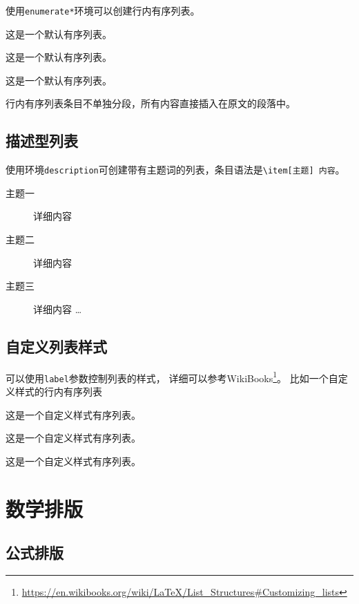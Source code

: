 \documentclass[doctor,openright,twoside]{sjtuthesis}
\theoremstyle{plain}
\theoremstyle{definition}
\theoremstyle{remark}
\theoremstyle{ocrenumbox}
\theoremstyle{plain}
\begin{document}
使用\verb+enumerate*+环境可以创建行内有序列表。

\begin{enumerate*}
  \item 这是一个默认有序列表。
  \item 这是一个默认有序列表。
  \item 这是一个默认有序列表。
\end{enumerate*}

行内有序列表条目不单独分段，所有内容直接插入在原文的段落中。

\subsection{描述型列表}

使用环境\verb+description+可创建带有主题词的列表，条目语法是\verb+\item[主题] 内容+。

\begin{description}
    \item[主题一] 详细内容
    \item[主题二] 详细内容
    \item[主题三] 详细内容 \ldots
\end{description}

\subsection{自定义列表样式}

可以使用\verb+label+参数控制列表的样式，
详细可以参考WikiBooks\footnote{\url{https://en.wikibooks.org/wiki/LaTeX/List_Structures\#Customizing_lists}}。
比如一个自定义样式的行内有序列表

\begin{enumerate*}[label=\itshape\alph*)\upshape]
  \item 这是一个自定义样式有序列表。
  \item 这是一个自定义样式有序列表。
  \item 这是一个自定义样式有序列表。
\end{enumerate*}

\section{数学排版}
\label{sec:matheq}

\subsection{公式排版}
\label{sec:eqformat}
\end{document}
